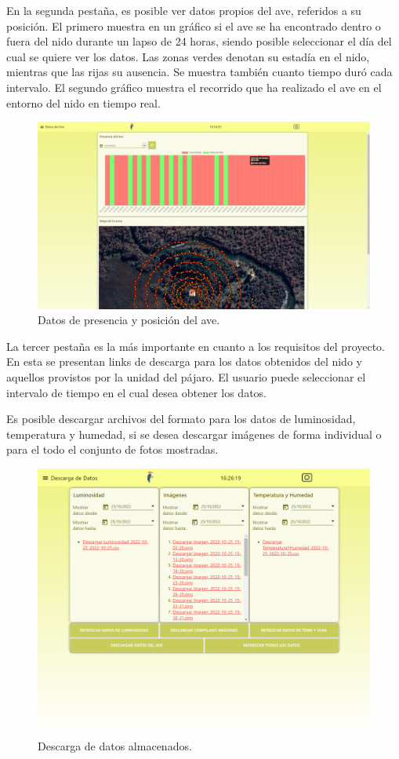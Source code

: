 En la segunda pestaña, es posible ver datos propios del ave, referidos a su posición. El primero muestra en un gráfico si el ave se ha encontrado dentro o fuera del nido durante un lapso de 24 horas, siendo posible seleccionar el día del cual se quiere ver los datos. Las zonas verdes denotan su estadía en el nido, mientras que las rijas su ausencia. Se muestra también cuanto tiempo duró cada intervalo. El segundo gráfico muestra el recorrido que ha realizado el ave en el entorno del nido en tiempo real.
\begin{figure}[H]
	\centering
    \includegraphics[width=0.7\linewidth]{ImagenesIngenieria de Detalle/Node-Red-Bird-Data}	
	\caption{Datos de presencia y posición del ave.}
	\label{fig:node_red_bird}
\end{figure}

La tercer pestaña es la más importante en cuanto a los requisitos del proyecto. En esta se presentan links de descarga para los datos obtenidos del nido y aquellos provistos por la unidad del pájaro. El usuario puede seleccionar el intervalo de tiempo en el cual desea obtener los datos.

Es posible descargar archivos del formato  para los datos de luminosidad, temperatura y humedad,  si se desea descargar imágenes de forma individual o  para el todo el conjunto de fotos mostradas.
\begin{figure}[H]
	\centering
    \includegraphics[width=0.7\linewidth]{ImagenesIngenieria de Detalle/Node-Red-Download}	
	\caption{Descarga de datos almacenados.}
	\label{fig:node_red_download}
\end{figure}

